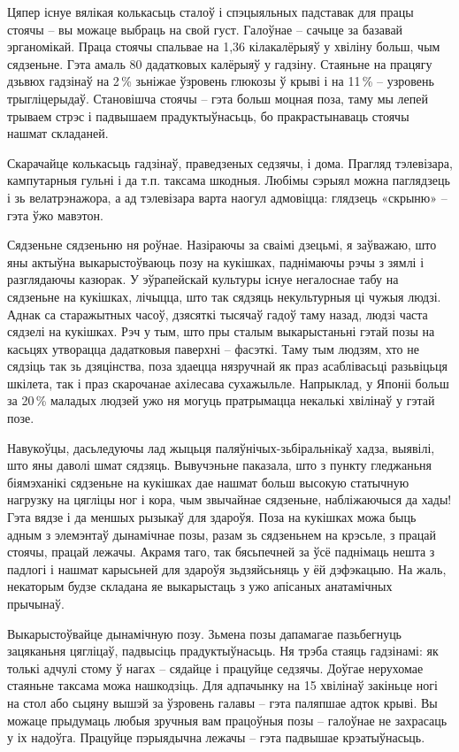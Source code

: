 Цяпер існуе вялікая колькасьць сталоў і спэцыяльных падставак для працы стоячы – вы можаце выбраць на свой густ. Галоўнае – сачыце за базавай эрганомікай. Праца стоячы спальвае на 1,36 кілакалёрыяў у хвіліну больш, чым сядзеньне. Гэта амаль 80 дадатковых калёрыяў у гадзіну. Стаяньне на працягу дзьвюх гадзінаў на 2\,\% зьніжае ўзровень глюкозы ў крыві і на 11\,\% – узровень трыгліцерыдаў. Становішча стоячы – гэта больш моцная поза, таму мы лепей трываем стрэс і падвышаем прадуктыўнасьць, бо пракрастынаваць стоячы нашмат складаней.

Скарачайце колькасьць гадзінаў, праведзеных седзячы, і дома. Прагляд тэлевізара, кампутарныя гульні і да т.п. таксама шкодныя. Любімы сэрыял можна паглядзець і зь велатрэнажора, а ад тэлевізара варта наогул адмовіцца: глядзець «скрыню» – гэта ўжо мавэтон.

Сядзеньне сядзеньню ня роўнае. Назіраючы за сваімі дзецьмі, я заўважаю, што яны актыўна выкарыстоўваюць позу на кукішках, паднімаючы рэчы з зямлі і разглядаючы казюрак. У эўрапейскай культуры існуе негалоснае табу на сядзеньне на кукішках, лічыцца, што так сядзяць некультурныя ці чужыя людзі. Аднак са старажытных часоў, дзясяткі тысячаў гадоў таму назад, людзі часта сядзелі на кукішках. Рэч у тым, што пры сталым выкарыстаньні гэтай позы на касьцях утворацца дадатковыя паверхні – фасэткі. Таму тым людзям, хто не сядзіць так зь дзяцінства, поза здаецца нязручнай як праз асаблівасьці разьвіцьця шкілета, так і праз скарочанае ахілесава сухажыльле. Напрыклад, у Японіі больш за 20\,\% маладых людзей ужо ня могуць пратрымацца некалькі хвілінаў у гэтай позе.

Навукоўцы, дасьледуючы лад жыцьця паляўнічых-зьбіральнікаў хадза, выявілі, што яны даволі шмат сядзяць. Вывучэньне паказала, што з пункту гледжаньня біямэханікі сядзеньне на кукішках дае нашмат больш высокую статычную нагрузку на цягліцы ног і кора, чым звычайнае сядзеньне, набліжаючыся да хады! Гэта вядзе і да меншых рызыкаў для здароўя. Поза на кукішках можа быць адным з элемэнтаў дынамічнае позы, разам зь сядзеньнем на крэсьле, з працай стоячы, працай лежачы. Акрамя таго, так бясьпечней за ўсё паднімаць нешта з падлогі і нашмат карысьней для здароўя зьдзяйсьняць у ёй дэфэкацыю. На жаль, некаторым будзе складана яе выкарыстаць з ужо апісаных анатамічных прычынаў.

Выкарыстоўвайце дынамічную позу. Зьмена позы дапамагае пазьбегнуць зацяканьня цягліцаў, падвысіць прадуктыўнасьць. Ня трэба стаяць гадзінамі: як толькі адчулі стому ў нагах – сядайце і працуйце седзячы. Доўгае нерухомае стаяньне таксама можа нашкодзіць. Для адпачынку на 15 хвілінаў закіньце ногі на стол або сьцяну вышэй за ўзровень галавы – гэта паляпшае адток крыві. Вы можаце прыдумаць любыя зручныя вам працоўныя позы – галоўнае не захрасаць у іх надоўга. Працуйце пэрыядычна лежачы – гэта падвышае крэатыўнасьць.


